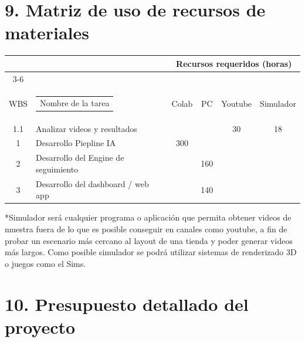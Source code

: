 \documentclass[11pt]{charter}
\begin{document}
\section{9. Matriz de uso de recursos de materiales}
\label{sec:recursos}


\begin{table}[htpb]
\label{tab:recursos}
\centering
\begin{tabularx}{\linewidth}{@{}|c|X|c|c|c|c|@{}}
\hline
\cellcolor[HTML]{C0C0C0} & \cellcolor[HTML]{C0C0C0} & \multicolumn{4}{c|}{\cellcolor[HTML]{C0C0C0}Recursos requeridos (horas)} \\ \cline{3-6} 
\multirow{-2}{*}{\cellcolor[HTML]{C0C0C0}\begin{tabular}[c]{@{}c@{}}Código\\ WBS\end{tabular}} & \multirow{-2}{*}{\cellcolor[HTML]{C0C0C0}\begin{tabular}[c]{@{}c@{}}Nombre de la tarea\end{tabular}} & Colab & PC & Youtube & Simulador \\ \hline
 1.1& Analizar videos y resultados	&  		&	&  30	& 18 \\ \hline
 1 	& Desarrollo Piepline IA 	&   300 &  		&  		&  \\ \hline
 2	& Desarrollo del Engine de seguimiento &  & 160  &  &  \\ \hline
 3	& Desarrollo del dashboard / web app & & 140 &  &  \\ \hline

\end{tabularx}%
\end{table}

*Simulador será cualquier programa o aplicación que permita obtener videos de muestra fuera de lo que es posible conseguir en canales como youtube, a fin de probar un escenario más cercano al layout de una tienda y poder generar videos más largos. Como posible simulador se podrá utilizar sistemas de renderizado 3D o juegos como el Sims.

\newpage

\section{10. Presupuesto detallado del proyecto}
\label{sec:presupuesto}
\end{document}
